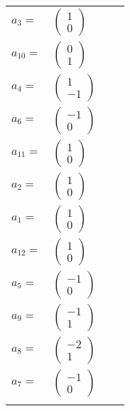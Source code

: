 \documentclass[1p]{elsarticle_modified}
\theoremstyle{definition}
\begin{document}
\begin{tabular}{m{7pt} m{180pt} m{7pt} m{180pt} }
\flushright $a_{3}=$&$\begin{pmatrix}1\\0\end{pmatrix}$ \\
\flushright $a_{10}=$&$\begin{pmatrix}0\\1\end{pmatrix}$ \\
\flushright $a_{4}=$&$\begin{pmatrix}1\\-1\end{pmatrix}$ \\
\flushright $a_{6}=$&$\begin{pmatrix}-1\\0\end{pmatrix}$ \\
\flushright $a_{11}=$&$\begin{pmatrix}1\\0\end{pmatrix}$ \\
\flushright $a_{2}=$&$\begin{pmatrix}1\\0\end{pmatrix}$ \\
\flushright $a_{1}=$&$\begin{pmatrix}1\\0\end{pmatrix}$ \\
\flushright $a_{12}=$&$\begin{pmatrix}1\\0\end{pmatrix}$ \\
\flushright $a_{5}=$&$\begin{pmatrix}-1\\0\end{pmatrix}$ \\
\flushright $a_{9}=$&$\begin{pmatrix}-1\\1\end{pmatrix}$ \\
\flushright $a_{8}=$&$\begin{pmatrix}-2\\1\end{pmatrix}$ \\
\flushright $a_{7}=$&$\begin{pmatrix}-1\\0\end{pmatrix}$\\&\end{tabular}
\end{document}
